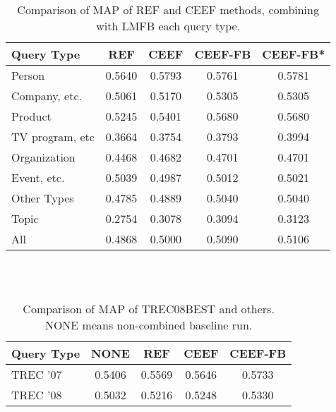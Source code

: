\begin{table}[h]
	\centering
		\begin{tabular}{lS[tabnumalign=centre,tabformat=1.4,decimalsymbol=comma]S[tabnumalign=centre,tabformat=1.4,decimalsymbol=comma]S[tabnumalign=centre,tabformat=1.4,decimalsymbol=comma]S[tabnumalign=centre,tabformat=1.4,decimalsymbol=comma]}
			\toprule
			Query Type & {REF} & {CEEF} & {CEEF-FB} & {CEEF-FB*}\\
			\midrule
			Person & 0.5640 & 0.5793 & 0.5761 & 0.5781\\
			Company, etc. & 0.5061 & 0.5170 & 0.5305 & 0.5305\\
			Product & 0.5245 & 0.5401 & 0.5680 & 0.5680\\
			TV program, etc & 0.3664 & 0.3754 & 0.3793 & 0.3994\\
			Organization & 0.4468 & 0.4682 & 0.4701 & 0.4701\\
			Event, etc. & 0.5039 & 0.4987 & 0.5012 & 0.5021\\
			Other Types & 0.4785 & 0.4889 & 0.5040 & 0.5040\\
			Topic & 0.2754 & 0.3078 & 0.3094 & 0.3123\\
			All & 0.4868 & 0.5000 & 0.5090 & 0.5106\\
			\bottomrule
		\end{tabular}
		\caption{Comparison of MAP of REF and CEEF methods, combining with LMFB each query type.\cite{paper:Na}}
\end{table}\\
\\
\begin{table}[h]
	\centering
	\begin{tabular}{lS[tabnumalign=centre,tabformat=1.4,decimalsymbol=comma]S[tabnumalign=centre,tabformat=1.4,decimalsymbol=comma]S[tabnumalign=centre,tabformat=1.4,decimalsymbol=comma]S[tabnumalign=centre,tabformat=1.4,decimalsymbol=comma]}
		\toprule
		Query Type & {NONE} & {REF} & {CEEF} & {CEEF-FB}\\
		\midrule
		TREC '07 & 0.5406 & 0.5569 & 0.5646 & 0.5733\\
		TREC '08 & 0.5032 & 0.5216 & 0.5248 & 0.5330\\
		\bottomrule
	\end{tabular}
	\caption{Comparison of MAP of TREC08BEST and others. NONE means non-combined baseline run.}
	\cite{paper:Na}
\end{table}\\
\\
